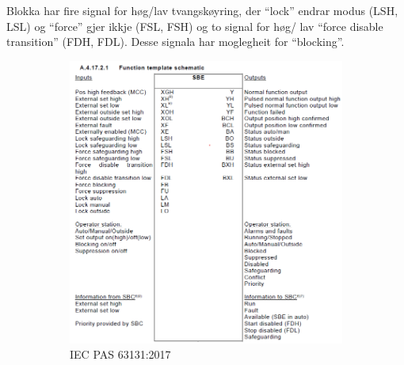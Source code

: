 Blokka har fire signal for høg/lav tvangskøyring, der ``lock'' endrar modus (LSH, LSL) og ``force'' gjer ikkje (FSL, FSH)
og to signal for høg/ lav ``force disable transition'' (FDH, FDL).
Desse signala har moglegheit for ``blocking''.

\newpage

\begin{figure}[htbp]
    \centering
    \begin{subfigure}[b]{0.46\textwidth}
        \centering
        \includegraphics[width=1\textwidth]{Bilder/SBEBlokkIEC.png}
        \caption{\gls{IEC} \gls{PAS} 63131:2017 \citep{SBE}}\label{fig:Switch Binary Electrical blokk IEC}
    \end{subfigure}
    \hfill
    \begin{subfigure}[b]{0.46\textwidth}
        \centering

\end{subfigure}
\end{figure}

